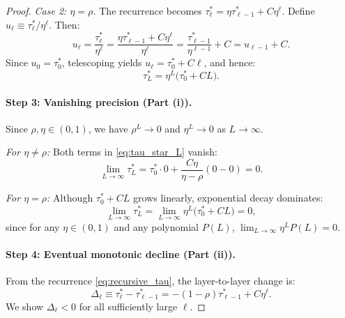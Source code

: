 \begin{proof}
\textit{Case 2: $\eta = \rho$.} The recurrence becomes $\tau^{*}_{\ell} = \eta \tau^{*}_{\ell-1} + C\eta^{\ell}$. Define $u_{\ell} \equiv \tau^{*}_{\ell} / \eta^{\ell}$. Then:
\begin{equation*}
u_{\ell} = \frac{\tau^{*}_{\ell}}{\eta^{\ell}} = \frac{\eta\tau^{*}_{\ell-1} + C\eta^{\ell}}{\eta^{\ell}} = \frac{\tau^{*}_{\ell-1}}{\eta^{\ell-1}} + C = u_{\ell-1} + C.
\end{equation*}
Since $u_{0} = \tau^{*}_{0}$, telescoping yields $u_{\ell} = \tau^{*}_{0} + C\ell$, and hence:
\begin{equation}\label{eq:tau_equal_case}
\tau^{*}_{L} = \eta^{L}\bigl(\tau^{*}_{0} + CL\bigr).
\end{equation}

\paragraph{Step 3: Vanishing precision (Part (i)).}
Since $\rho, \eta \in (0,1)$, we have $\rho^{L} \to 0$ and $\eta^{L} \to 0$ as $L \to \infty$.

\textit{For $\eta \neq \rho$:} Both terms in \eqref{eq:tau_star_L} vanish:
\begin{equation}
\lim_{L\to\infty} \tau^{*}_{L} = \tau^{*}_{0} \cdot 0 + \frac{C\eta}{\eta-\rho}(0 - 0) = 0.
\end{equation}

\textit{For $\eta = \rho$:} Although $\tau^{*}_{0} + CL$ grows linearly, exponential decay dominates:
\begin{equation}
\lim_{L\to\infty} \tau^{*}_{L} = \lim_{L\to\infty} \eta^{L}\bigl(\tau^{*}_{0} + CL\bigr) = 0,
\end{equation}
since for any $\eta \in (0,1)$ and any polynomial $P(L)$, $\lim_{L\to\infty} \eta^{L} P(L) = 0$.

\paragraph{Step 4: Eventual monotonic decline (Part (ii)).}
From the recurrence \eqref{eq:recursive_tau}, the layer-to-layer change is:
\begin{equation}\label{eq:delta_tau}
\Delta_{\ell} \equiv \tau^{*}_{\ell} - \tau^{*}_{\ell-1} = -(1-\rho)\tau^{*}_{\ell-1} + C\eta^{\ell}.
\end{equation}
We show $\Delta_{\ell} < 0$ for all sufficiently large $\ell$.


\end{proof}
